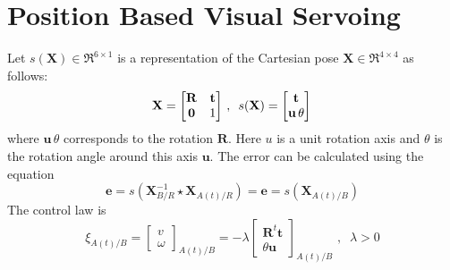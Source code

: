 \documentclass[a4paper,12pt]{article}
\begin{document}
\section{Position Based Visual Servoing}  
Let $s(\mathbf{X}) \in \Re^{6 \times 1}$ is a representation of the Cartesian pose  $\mathbf{X} \in \Re^{4 \times 4}$ as follows:
\begin{equation}
        \mathbf{X} =
        \begin{bmatrix}
        \mathbf{R} & \mathbf{t} \\
        \mathbf{0} & 1
        \end{bmatrix}
        \,,\,\,\,
        s(\mathbf{X}) =
        \begin{bmatrix}
        \mathbf{t} \\
        \mathbf{u}\, \theta \\
        \end{bmatrix}\\
        \label{eq:pppbvs}
\end{equation}
where $\mathbf{u}\, \theta $ corresponds to the rotation $\mathbf{R}$. Here $u$ is a unit rotation axis and $\theta$ is the rotation angle around
this axis $\mathbf{u}$. The error can be calculated using the equation
\begin{equation}
        \mathbf{e} = s\left(
        \mathbf{X}_{B/R}^{-1} \star \mathbf{X}_{A(t)/R}
        \right) =
        \mathbf{e} = s\left(
        \mathbf{X}_{A(t)/B}
        \right)
        \label{eq:perror}
\end{equation}
The control law is 
\begin{equation}
        \xi_{A(t)/B} = 
        \begin{bmatrix}
                v \\
                \omega
        \end{bmatrix}_{A(t)/B} =                
        - \lambda 
        \begin{bmatrix}
                \mathbf{R}^t\mathbf{t} \\
                \theta \mathbf{u}
        \end{bmatrix}_{A(t)/B}
        \,\,,\;\; \lambda >0            
                \label{eq:plaw}
\end{equation}
\end{document}
